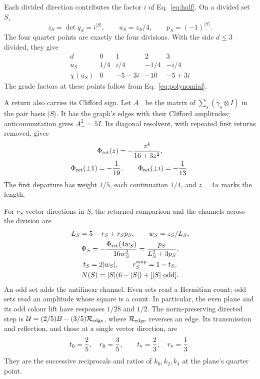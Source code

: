 \documentclass[aps,prx,reprint,longbibliography]{revtex4-2}
\providecommand{\Phis}{\Phi_{\rm ret}}
\begin{document}
Each divided direction contributes the factor $i$ of Eq.~\eqref{eq:half}. On a divided set $S$,
\begin{equation}
 z_S=\det q_S=i^{|S|},\qquad u_S=z_S/4,\qquad p_S=(-1)^{|S|}.
 \label{eq:phase}
\end{equation}
The four quarter points are exactly the four divisions. With the side $d\leq3$ divided, they give
\begin{equation}
 \begin{array}{c|rrrr}
 d&0&1&2&3\\\hline
 u_S&1/4&i/4&-1/4&-i/4\\
 \chi(u_S)&0&-5-3i&-10&-5+3i
 \end{array}
 \label{eq:division_values}
\end{equation}
The grade factors at these points follow from Eq.~\eqref{eq:polynomial}.

A return also carries its Clifford sign. Let $A_-$ be the matrix of $\sum_s(\gamma_s\otimes I)$ in the pair basis $\lvert S\rangle$. It has the graph's edges with their Clifford amplitudes; anticommutation gives $A_-^2=5I$. Its diagonal resolvent, with repeated first returns removed, gives
\begin{equation}
\begin{gathered}
 \Phis(z)=-\frac{z^4}{16+3z^2},\\
 \Phis(\pm1)=-\frac1{19},\qquad\Phis(\pm i)=-\frac1{13}.
 \end{gathered}
 \label{eq:signed_first_return}
\end{equation}
The first departure has weight $1/5$, each continuation $1/4$, and $z=4u$ marks the length.

For $r_S$ vector directions in $S$, the returned comparison and the channels across the division are
\begin{equation}
 \begin{gathered}
 L_S=5-r_S+r_Sp_S,\qquad w_S=z_S/L_S,\\
 \Psi_S=-\frac{\Phis(4w_S)}{16w_S^2}
       =\frac{p_S}{L_S^2+3p_S},\\
 t_S=2|w_S|,\qquad r_S^{\rm amp}=1-t_S,\\
 N(S)=|S|(6-|S|)+[|S|\ {\rm odd}].
 \end{gathered}
 \label{eq:support_rule}
\end{equation}
An odd set adds the antilinear channel. Even sets read a Hermitian count; odd sets read an amplitude whose square is a count. In particular, the even plane and its odd colour lift have responses $1/28$ and $1/2$. The norm-preserving directed step is $\mathcal U=(2/5)B-(3/5)\mathcal R_{\rm edge}$, where $\mathcal R_{\rm edge}$ reverses an edge. Its transmission and reflection, and those at a single vector direction, are
\begin{equation}
 t_0=\frac25,\quad r_0=\frac35,\qquad
 t_{\rm v}=\frac23,\quad r_{\rm v}=\frac13.
 \label{eq:grade_amplitudes}
\end{equation}
They are the successive reciprocals and ratios of $k_0,k_2,k_4$ at the plane's quarter point.
\end{document}
